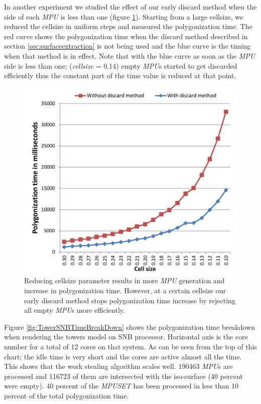 In another experiment we studied the effect of our early discard method when the side of each \textit{MPU} is less than one 
(figure \ref{fig:DiscardEffect}). Starting from a large cellsize, we reduced the cellsize in uniform steps and measured the polygonization time. 
The red curve shows the polygonization time when the discard method described in section \ref{sec:surfaceextraction} is not being used and the blue curve 
is the timing when that method is in effect. Note that with the blue curve as soon as the \textit{MPU} side is less than one; (\textit{cellsize} = 0.14) empty 
\textit{MPU}s started to get discarded efficiently thus the constant part of the time value is reduced at that point.

\begin{figure}[htb]
  \centering
  \includegraphics[width = 1.0\linewidth]{figures/cpupoly/DiscardEffect2.pdf}
  \caption{\label{fig:DiscardEffect}
  {Reducing cellsize parameter results in more \textit{MPU} generation and increase in polygonization time.
  However, at a certain cellsize our early discard method stops polygonization time increase by rejecting 
  all empty \textit{MPU}s more efficiently.}
}
\end{figure}



Figure \ref{fig:TowerSNBTimeBreakDown} shows the polygonization time breakdown when rendering the towers model on SNB processor. 
Horizontal axis is the core number for a total of 12 cores on that system. As can be seen from the top of this chart; 
the idle time is very short and the cores are active almost all the time. This shows that the work stealing algorithm scales well. 
190463 \textit{MPU}s are processed and 116723 of them are intersected with the iso-surface (40 percent were empty).
40 percent of the \textit{MPUSET} has been processed in less than 10 percent of the total polygonization time.

